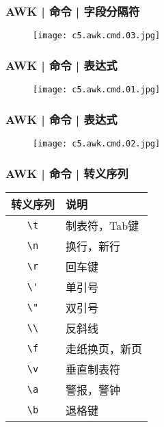 \begin{frame}
  \frametitle{AWK | 命令 | 字段分隔符}
  \begin{figure}
    \centering
    \texttt{[image: c5.awk.cmd.03.jpg]}
  \end{figure}
\end{frame}

\begin{frame}
  \frametitle{AWK | 命令 | 表达式}
  \begin{figure}
    \centering
    \texttt{[image: c5.awk.cmd.01.jpg]}
  \end{figure}
\end{frame}

\begin{frame}
  \frametitle{AWK | 命令 | 表达式}
  \begin{figure}
    \centering
    \texttt{[image: c5.awk.cmd.02.jpg]}
  \end{figure}
\end{frame}

\begin{frame}[fragile]
  \frametitle{AWK | 命令 | \alert{转义序列}}
  \begin{table}
    \centering
    \begin{tabularx}{0.8\textwidth}{cX}
      \hline
      \rowcolor{blue!50}转义序列 & 说明\\
      \hline
      \verb|\t| & 制表符，Tab键\\
      \verb|\n| & 换行，新行\\
      \verb|\r| & 回车键\\
      \verb|\'| & 单引号\\
      \verb|\"| & 双引号\\
      \verb|\\| & 反斜线\\
      \verb|\f| & 走纸换页，新页\\
      \verb|\v| & 垂直制表符\\
      \verb|\a| & 警报，警钟\\
      \verb|\b| & 退格键\\
      \hline
    \end{tabularx}
  \end{table}
\end{frame}



